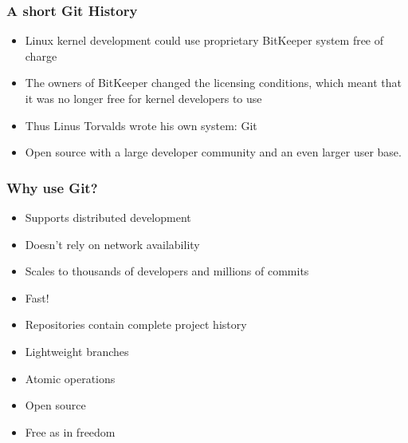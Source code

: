 \begin{frame}
\frametitle{A short Git History}
\begin{itemize}
    \item Linux kernel development could use proprietary BitKeeper system
        free of charge
    \item The owners of BitKeeper changed the licensing conditions, which
        meant that it was no longer free for kernel developers to use
    \item Thus Linus Torvalds wrote his own system: Git
    \item Open source with a large developer community and an even larger
        user base.
\end{itemize}
\end{frame}

\begin{frame}
    \frametitle{Why use Git?}
    \begin{itemize}
        \item Supports distributed development
        \item Doesn't rely on network availability
        \item Scales to thousands of developers and millions of commits
        \item Fast!
        \item Repositories contain complete project history
        \item Lightweight branches
        \item Atomic operations
        \item Open source
        \item Free as in freedom
    \end{itemize}
\end{frame}

